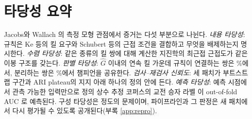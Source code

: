 \section{타당성 요약}
\label{sec:eng-validity}

Jacobs와 Wallach \cite{jacobs2021measurement}의 측정 모형 관점에서 증거는 다섯 부분으로 나뉜다. \emph{내용 타당성}: 규칙은 Ke 등의 킬 요구와 Schubert 등의 근접 조건을 결합하고 무엇을 배제하는지 명시한다. \emph{수렴 타당성}: 같은 종류의 킬 쌍에 대해 계산한 지진학의 최근접 근접도가 같은 이봉 구조를 갖는다. \emph{판별 타당성}: $\hat G$ 이내의 연속 킬 가운데 규칙이 연결하는 쌍은 \shareLinkedPairs{}\%에서, 분리하는 쌍은 \shareSeparatedPairs{}\%에서 챔피언을 공유한다. \emph{검사--재검사 신뢰도}: 세 패치가 부트스트랩 구간과 ARI plateau의 지지 아래 하나의 정의 안에 든다. \emph{예측 타당성}: 예측 시점에서 관측 가능한 입력만으로 정의 상수 추정 코퍼스의 교전 승자 라벨 \cite{baek2026killconditioned}이 out-of-fold AUC \aucLineageOOF{}로 예측된다. 구성 타당성은 정도의 문제이며, 파이프라인과 그 판정은 새 패치에서 다시 평가될 수 있도록 공개된다(부록 \ref{app:repro}).
